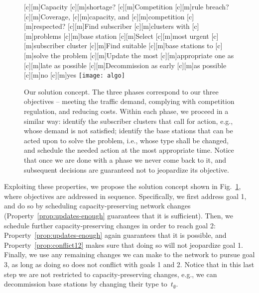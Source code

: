 \documentclass[10pt,journal,cspaper,compsoc]{IEEEtran}
\newcommand{\Fig}[1]{Fig.~\ref{fig:#1}}
\newcommand{\Prop}[1]{Property~\ref{prop:#1}}
\begin{document}
\begin{figure}[t!]
[c][m]{\scriptsize{Capacity}}
[c][m]{\scriptsize{shortage?}}
[c][m]{\scriptsize{Competition}}
[c][m]{\scriptsize{rule breach?}}
[c][m]{\scriptsize{Coverage,}}
[c][m]{\scriptsize{capacity, and}}
[c][m]{\scriptsize{competition}}
[c][m]{\scriptsize{respected?}}
[c][m]{\scriptsize{Find subscriber}}
[c][m]{\scriptsize{clusters with}}
[c][m]{\scriptsize{problems}}
[c][m]{\scriptsize{base station}}
[c][m]{\scriptsize{Select}}
[c][m]{\scriptsize{most urgent}}
[c][m]{\scriptsize{subscriber cluster}}
[c][m]{\scriptsize{Find suitable}}
[c][m]{\scriptsize{base stations to}}
[c][m]{\scriptsize{solve the problem}}
[c][m]{\scriptsize{Update the most}}
[c][m]{\scriptsize{appropriate one as}}
[c][m]{\scriptsize{late as possible}}
[c][m]{\scriptsize{Decommission as early}}
[c][m]{\scriptsize{as possible}}
[c][m]{\small{no}}
[c][m]{\small{yes}}
\centering
	\texttt{[image: algo]}
	\caption{Our solution concept. The three phases correspond to our three objectives -- meeting the traffic
	demand, complying with competition regulation, and reducing costs. Within each phase, we proceed in a similar way: identify
	the subscriber clusters that call for action, e.g., whose demand is not satisfied; identify the base stations that can
	be acted upon to solve the problem,
	i.e., whose type shall be changed, and
	schedule the needed action
	at the most appropriate time. Notice that once we are done with a phase we never come back to it, and subsequent
	decisions are guaranteed not to jeopardize its objective.}
	\label{fig:solution}
\end{figure}

Exploiting these properties, we propose the solution concept
shown in \Fig{solution}, where objectives are
addressed in sequence. Specifically, we first address
goal 1, and do so by
scheduling capacity-preserving network changes (\Prop{updates-enough} guarantees that it is sufficient).
Then, we schedule further capacity-preserving changes in order to reach goal 2: \Prop{updates-enough}
again guarantees that it is possible, and \Prop{conflict12} makes sure that doing so will not jeopardize goal 1.
Finally, we use any remaining changes we can make to the network to pursue goal 3,
as long as doing so does not conflict with goals 1 and 2. Notice that in this last step we are not restricted to capacity-preserving
changes, e.g., we can decommission base stations by changing their type to~$t_\emptyset$.
\end{document}
